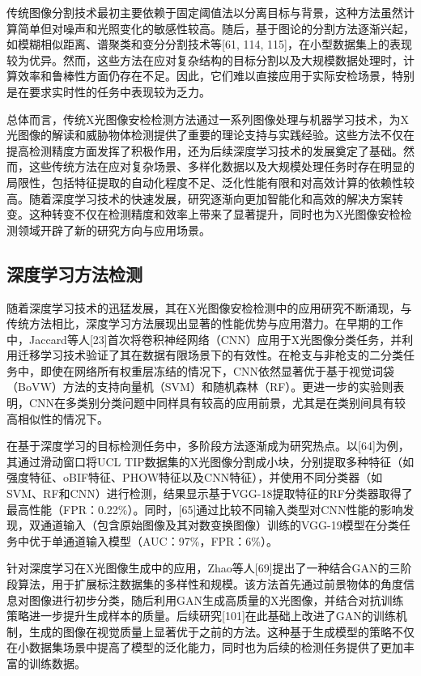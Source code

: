 \documentclass[11pt,twocolumn]{ctexart}
\begin{document}
传统图像分割技术最初主要依赖于固定阈值法以分离目标与背景，这种方法虽然计算简单但对噪声和光照变化的敏感性较高。随后，基于图论的分割方法逐渐兴起，如模糊相似距离、谱聚类和变分分割技术等[61, 114, 115]，在小型数据集上的表现较为优异。然而，这些方法在应对复杂结构的目标分割以及大规模数据处理时，计算效率和鲁棒性方面仍存在不足。因此，它们难以直接应用于实际安检场景，特别是在要求实时性的任务中表现较为乏力。

总体而言，传统X光图像安检检测方法通过一系列图像处理与机器学习技术，为X光图像的解读和威胁物体检测提供了重要的理论支持与实践经验。这些方法不仅在提高检测精度方面发挥了积极作用，还为后续深度学习技术的发展奠定了基础。然而，这些传统方法在应对复杂场景、多样化数据以及大规模处理任务时存在明显的局限性，包括特征提取的自动化程度不足、泛化性能有限和对高效计算的依赖性较高。随着深度学习技术的快速发展，研究逐渐向更加智能化和高效的解决方案转变。这种转变不仅在检测精度和效率上带来了显著提升，同时也为X光图像安检检测领域开辟了新的研究方向与应用场景。

\subsection{深度学习方法检测}
随着深度学习技术的迅猛发展，其在X光图像安检检测中的应用研究不断涌现，与传统方法相比，深度学习方法展现出显著的性能优势与应用潜力。在早期的工作中，Jaccard等人[23]首次将卷积神经网络（CNN）应用于X光图像分类任务，并利用迁移学习技术验证了其在数据有限场景下的有效性。在枪支与非枪支的二分类任务中，即使在网络所有权重层冻结的情况下，CNN依然显著优于基于视觉词袋（BoVW）方法的支持向量机（SVM）和随机森林（RF）。更进一步的实验则表明，CNN在多类别分类问题中同样具有较高的应用前景，尤其是在类别间具有较高相似性的情况下。

在基于深度学习的目标检测任务中，多阶段方法逐渐成为研究热点。以[64]为例，其通过滑动窗口将UCL TIP数据集的X光图像分割成小块，分别提取多种特征（如强度特征、oBIF特征、PHOW特征以及CNN特征），并使用不同分类器（如SVM、RF和CNN）进行检测，结果显示基于VGG-18提取特征的RF分类器取得了最高性能（FPR：0.22\%）。同时，[65]通过比较不同输入类型对CNN性能的影响发现，双通道输入（包含原始图像及其对数变换图像）训练的VGG-19模型在分类任务中优于单通道输入模型（AUC：97\%，FPR：6\%）。

针对深度学习在X光图像生成中的应用，Zhao等人[69]提出了一种结合GAN的三阶段算法，用于扩展标注数据集的多样性和规模。该方法首先通过前景物体的角度信息对图像进行初步分类，随后利用GAN生成高质量的X光图像，并结合对抗训练策略进一步提升生成样本的质量。后续研究[101]在此基础上改进了GAN的训练机制，生成的图像在视觉质量上显著优于之前的方法。这种基于生成模型的策略不仅在小数据集场景中提高了模型的泛化能力，同时也为后续的检测任务提供了更加丰富的训练数据。
\end{document}
